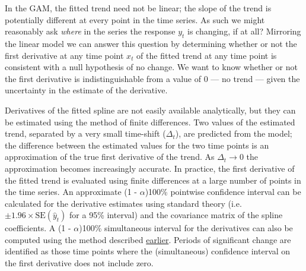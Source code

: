 \documentclass[12pt,]{article}
\begin{document}
In the GAM, the fitted trend need not be linear; the slope of the trend
is potentially different at every point in the time series. As such we
might reasonably ask \emph{where} in the series the response \(y_t\) is
changing, if at all? Mirroring the linear model we can answer this
question by determining whether or not the first derivative at any time
point \(x_t\) of the fitted trend at any time point is consistent with a
null hypothesis of no change. We want to know whether or not the first
derivative is indistinguishable from a value of \(0\) --- no trend ---
given the uncertainty in the estimate of the derivative.

Derivatives of the fitted spline are not easily available analytically,
but they can be estimated using the method of finite differences. Two
values of the estimated trend, separated by a very small time-shift
(\(\Delta_t\)), are predicted from the model; the difference between the
estimated values for the two time points is an approximation of the true
first derivative of the trend. As \(\Delta_t \rightarrow 0\) the
approximation becomes increasingly accurate. In practice, the first
derivative of the fitted trend is evaluated using finite differences at
a large number of points in the time series. An approximate (1 -
\(\alpha\))100\% pointwise confidence interval can be calculated for the
derivative estimates using standard theory
(i.e.~\(\pm 1.96 \times \text{SE}(\hat{y}_t)\) for a 95\% interval) and
the covariance matrix of the spline coefficients. A (1 -
\(\alpha\))100\% simultaneous interval for the derivatives can also be
computed using the method described
\protect\hyperlink{confints}{earlier}. Periods of significant change are
identified as those time points where the (simultaneous) confidence
interval on the first derivative does not include zero.
\end{document}

